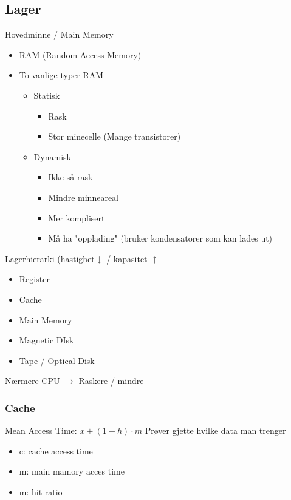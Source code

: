 \documentclass{article}
\begin{document}
		\subsection{Lager}
			Hovedminne / Main Memory
			\begin{itemize}
				\item RAM (Random Access Memory)
				\item To vanlige typer RAM
					\begin{itemize}
						\item Statisk
							\begin{itemize}
								\item Rask
								\item Stor minecelle (Mange transistorer)
							\end{itemize}
						\item Dynamisk
							\begin{itemize}
								\item Ikke så rask
								\item Mindre minneareal
								\item Mer komplisert
								\item Må ha "opplading" (bruker kondensatorer som kan lades ut)
							\end{itemize}
					\end{itemize}
			\end{itemize}
			Lagerhierarki (hastighet$\downarrow$ / kapasitet $\uparrow$ 
			
			\begin{itemize}
				\item Register
				\item Cache
				\item Main Memory
				\item Magnetic DIsk
				\item Tape / Optical Disk
			\end{itemize}
		Nærmere CPU $\rightarrow$ Raskere / mindre
			\subsubsection{Cache}
				Mean Access Time: $x + (1 - h) \cdot m$
				Prøver gjette hvilke data man trenger
				\begin{itemize}
					\item c: cache access time
					\item m: main mamory acces time
					\item m: hit ratio
				\end{itemize}
\end{document}
